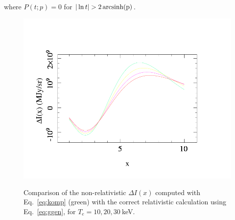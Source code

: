 where $P(t;p) = 0$ for $|\ln{t}| > 2{\,\rm arcsinh(p)}$.

\begin{figure}[th]
\begin{center}
\includegraphics[scale=0.3]{figures/gx.png}\\
\end{center}
\caption{Comparison of the non-relativistic $\Delta I(x)$ computed with Eq.~\ref{eq:komp} (green) with the correct relativistic calculation using Eq.~\ref{eq:ggen}, for $T_e = 10, 20, 30~$keV.}
\label{fig:gx}
\end{figure}

